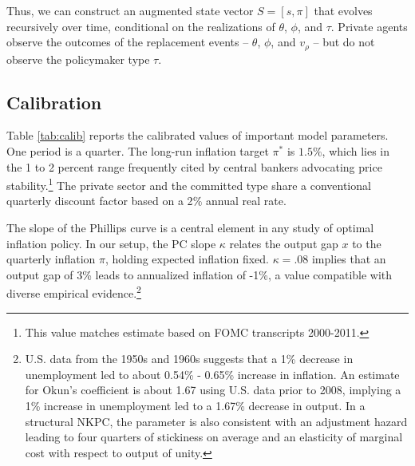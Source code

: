 \documentclass[12pt,letter,leqno]{article}
\theoremstyle{asn}
\theoremstyle{lem}
\theoremstyle{slem}
\theoremstyle{prop}
\theoremstyle{appprop}
\theoremstyle{rem}
\theoremstyle{defn}
\begin{document}
Thus, we can construct an augmented state vector $S = [s, \pi]$ that evolves recursively over time, conditional on the realizations of $\theta$, $\phi$, and $\tau$. Private agents observe the outcomes of the replacement events -- $\theta$, $\phi$, and $v_{\rho}$ -- but do not observe the policymaker type $\tau$.




\subsection{Calibration} 
Table \ref{tab:calib} reports the calibrated values of important model parameters. One period is a quarter. The long-run inflation target $\pi^*$ is $1.5\%$, which lies in the 1 to 2 percent range frequently cited by central bankers advocating price stability.\footnote{This value matches  \cite{Shapiro2019} estimate based on FOMC transcripts 2000-2011. }
The private sector and the committed type share a conventional quarterly discount factor based on a 2$\%$ annual real rate. 

The slope of the Phillips curve is a  central element in any study of optimal inflation policy. In our setup, the PC slope $\kappa$ relates the output gap $x$ to the quarterly inflation $\pi$, 
holding expected inflation fixed.
$\kappa=.08$ implies that an output gap of 3\% leads to annualized inflation of -1\%,
a value compatible with diverse empirical evidence.\footnote{U.S. data from the 1950s and 1960s suggests that a 1\% decrease in unemployment led to about 0.54\% - 0.65\% increase in inflation. An estimate for Okun's coefficient is about 1.67 using U.S. data prior to 2008, implying a 1\% increase in unemployment led to a 1.67\% decrease in output. In a structural NKPC, the parameter is also consistent with an adjustment hazard leading to four quarters of stickiness on average and an elasticity of marginal cost with respect to output of unity. } 
\end{document}
